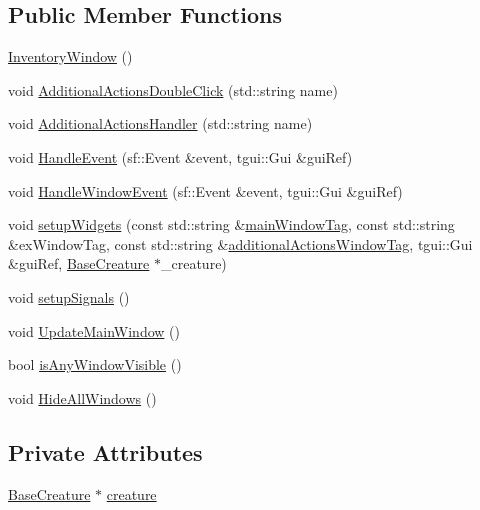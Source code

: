 \subsection*{Public Member Functions}
\begin{DoxyCompactItemize}
\item 
\mbox{\hyperlink{class_inventory_window_a95caa6b7f5cc394cb24ce44d3cd423c0}{Inventory\+Window}} ()
\item 
void \mbox{\hyperlink{class_inventory_window_a184239af4739a83163b45c4bb72ff6ec}{Additional\+Actions\+Double\+Click}} (std\+::string name)
\item 
void \mbox{\hyperlink{class_inventory_window_a5115f00fecccca34ba3559079a325a9a}{Additional\+Actions\+Handler}} (std\+::string name)
\item 
void \mbox{\hyperlink{class_inventory_window_ad023d9091385b9829673f6f592dd44ea}{Handle\+Event}} (sf\+::\+Event \&event, tgui\+::\+Gui \&gui\+Ref)
\item 
void \mbox{\hyperlink{class_inventory_window_a201c5b514200d4b3afc27fa056c1c365}{Handle\+Window\+Event}} (sf\+::\+Event \&event, tgui\+::\+Gui \&gui\+Ref)
\item 
void \mbox{\hyperlink{class_inventory_window_a0d286a4370871087af734042a3a6495d}{setup\+Widgets}} (const std\+::string \&\mbox{\hyperlink{class_selection_window_a555e8cf723b237c5a2bef0f190e03c76}{main\+Window\+Tag}}, const std\+::string \&ex\+Window\+Tag, const std\+::string \&\mbox{\hyperlink{class_selection_window_ae21c9fb80565153e0dc21b30f42e5db3}{additional\+Actions\+Window\+Tag}}, tgui\+::\+Gui \&gui\+Ref, \mbox{\hyperlink{class_base_creature}{Base\+Creature}} $\ast$\+\_\+creature)
\item 
void \mbox{\hyperlink{class_inventory_window_ada117b35239727b734887c1d56dcf6f0}{setup\+Signals}} ()
\item 
void \mbox{\hyperlink{class_inventory_window_a02cf6a3724a6ca38f12de98b96e8a8e7}{Update\+Main\+Window}} ()
\item 
bool \mbox{\hyperlink{class_inventory_window_a6fd4220caaec67979e93f5b8b52365a8}{is\+Any\+Window\+Visible}} ()
\item 
void \mbox{\hyperlink{class_inventory_window_aef14cbe5f17a626c01df9948aac71259}{Hide\+All\+Windows}} ()
\end{DoxyCompactItemize}
\subsection*{Private Attributes}
\begin{DoxyCompactItemize}
\item 
\mbox{\hyperlink{class_base_creature}{Base\+Creature}} $\ast$ \mbox{\hyperlink{class_inventory_window_a0a6e10b89b02f690ecd44792d7cb41e8}{creature}}
\end{DoxyCompactItemize}
